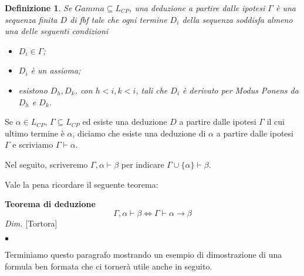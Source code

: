 \documentclass[a4paper, 12pt]{article}
\newtheorem{definition}{Definizione}
\begin{document}
\begin{definition}
Se $Gamma \subseteq L_{CP}$, una deduzione a partire dalle ipotesi $\Gamma$ è una sequenza finita $D$
di fbf tale che ogni termine $D_i$ della sequenza soddisfa almeno una delle seguenti condizioni
\begin{itemize}
\item $D_i \in \Gamma$;
\item $D_i$ è un assioma;
\item esistono $D_h, D_k$, con $h < i, k < i$, tali che $D_i$ è derivato per \textit{Modus Ponens}
da $D_h$ e $D_k$.
\end{itemize}
\end{definition}

Se $\alpha \in L_{CP}$, $\Gamma \subseteq L_{CP}$ ed esiste una deduzione $D$ a partire dalle ipotesi $\Gamma$
il cui ultimo termine è $\alpha$, diciamo che esiste una deduzione di $\alpha$
a partire dalle ipotesi $\Gamma$ e scriviamo $\Gamma \vdash \alpha$.

Nel seguito, scriveremo $\Gamma, \alpha \vdash \beta$
per indicare $\Gamma \cup \{\alpha\} \vdash \beta$.

Vale la pena ricordare il seguente teorema:
\begin{flushleft}
\textbf{Teorema di deduzione}
$$\Gamma, \alpha \vdash \beta \Leftrightarrow \Gamma \vdash \alpha \rightarrow \beta$$
\textit{Dim.} [Tortora]
\begin{flushright}
$\bullet$
\end{flushright}
\end{flushleft}


Terminiamo questo paragrafo mostrando un esempio di dimostrazione di una formula
ben formata che ci tornerà utile anche in seguito.
\end{document}
